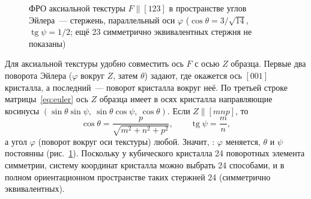 \begin{figure}[ht]
\centering
{}
\caption{ФРО аксиальной текстуры $F\parallel[123]$ в пространстве углов
Эйлера~— стержень, параллельный оси $\varphi$ ($\cos\theta=3/\sqrt{14}$,
$\operatorname{tg}\psi=1/2$; ещё 23 симметрично эквивалентных стержня не показаны)}
\label{fig:odf}
\end{figure}

Для аксиальной текстуры удобно совместить ось $F$ с осью $Z$ образца.
Первые два поворота Эйлера ($\varphi$ вокруг $Z$, затем $\theta$) задают,
где окажется ось $[001]$ кристалла, а последний~— поворот кристалла
вокруг неё. По третьей строке матрицы~\eqref{eq:euler} ось $Z$ образца
имеет в осях кристалла направляющие косинусы
$(\sin\theta\sin\psi,\ \sin\theta\cos\psi,\ \cos\theta)$. Если
$Z\parallel[mnp]$, то
\begin{equation}\label{eq:fiber-euler}
\cos\theta=\frac{p}{\sqrt{m^2+n^2+p^2}},\qquad \operatorname{tg}\psi=\frac mn ,
\end{equation}
а угол $\varphi$ (поворот вокруг оси текстуры) любой. Значит, : $\varphi$ меняется, $\theta$ и $\psi$
постоянны (рис.~\ref{fig:odf}). Поскольку у кубического кристалла
24 поворотных элемента симметрии, систему координат кристалла можно
выбрать 24 способами, и в полном ориентационном пространстве таких
стержней 24 (симметрично эквивалентных).

